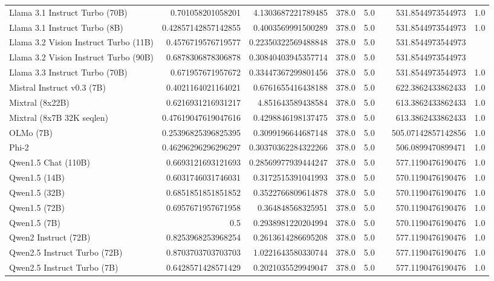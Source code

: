 \begin{table}[htp]
{\begin{tabular}{lrrrrrrr}
Llama 3.1 Instruct Turbo (70B) & 0.701058201058201 & 4.1303687221789485 & 378.0 & 5.0 &  & 531.8544973544973 & 1.0 \\
Llama 3.1 Instruct Turbo (8B) & 0.42857142857142855 & 0.4003569991500289 & 378.0 & 5.0 &  & 531.8544973544973 & 1.0 \\
Llama 3.2 Vision Instruct Turbo (11B) & 0.4576719576719577 & 0.22350322569488848 & 378.0 & 5.0 &  & 531.8544973544973 &  \\
Llama 3.2 Vision Instruct Turbo (90B) & 0.6878306878306878 & 0.30840403945357714 & 378.0 & 5.0 &  & 531.8544973544973 &  \\
Llama 3.3 Instruct Turbo (70B) & 0.671957671957672 & 0.33447367299801456 & 378.0 & 5.0 &  & 531.8544973544973 & 1.0 \\
Mistral Instruct v0.3 (7B) & 0.4021164021164021 & 0.6761655416438188 & 378.0 & 5.0 &  & 622.3862433862433 & 1.0 \\
Mixtral (8x22B) & 0.6216931216931217 & 4.851643589438584 & 378.0 & 5.0 &  & 613.3862433862433 & 1.0 \\
Mixtral (8x7B 32K seqlen) & 0.47619047619047616 & 0.4298846198137475 & 378.0 & 5.0 &  & 613.3862433862433 & 1.0 \\
OLMo (7B) & 0.25396825396825395 & 0.3099196644687148 & 378.0 & 5.0 &  & 505.07142857142856 & 1.0 \\
Phi-2 & 0.46296296296296297 & 0.30370362284322266 & 378.0 & 5.0 &  & 506.0899470899471 & 1.0 \\
Qwen1.5 Chat (110B) & 0.6693121693121693 & 0.28569977939444247 & 378.0 & 5.0 &  & 577.1190476190476 & 1.0 \\
Qwen1.5 (14B) & 0.6031746031746031 & 0.3172515391041993 & 378.0 & 5.0 &  & 570.1190476190476 & 1.0 \\
Qwen1.5 (32B) & 0.6851851851851852 & 0.3522766809614878 & 378.0 & 5.0 &  & 570.1190476190476 & 1.0 \\
Qwen1.5 (72B) & 0.6957671957671958 & 0.364848568325951 & 378.0 & 5.0 &  & 570.1190476190476 & 1.0 \\
Qwen1.5 (7B) & 0.5 & 0.2938981220204994 & 378.0 & 5.0 &  & 570.1190476190476 & 1.0 \\
Qwen2 Instruct (72B) & 0.8253968253968254 & 0.2613614286695208 & 378.0 & 5.0 &  & 577.1190476190476 & 1.0 \\
Qwen2.5 Instruct Turbo (72B) & 0.8703703703703703 & 1.0221643580330744 & 378.0 & 5.0 &  & 577.1190476190476 & 1.0 \\
Qwen2.5 Instruct Turbo (7B) & 0.6428571428571429 & 0.2021035529949047 & 378.0 & 5.0 &  & 577.1190476190476 & 1.0 \\

\end{tabular}}
\end{table}
